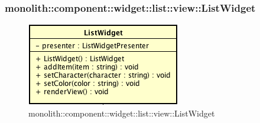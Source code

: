\subsubsection{monolith::component::widget::list::view::ListWidget}

\label{monolith::component::widget::list::view::ListWidget}
\begin{figure}[H]
	\centering
	\includegraphics[scale=0.5]{Sezioni/SottosezioniST/img/ListWidget.png}
	\caption{monolith::component::widget::list::view::ListWidget}
\end{figure}

